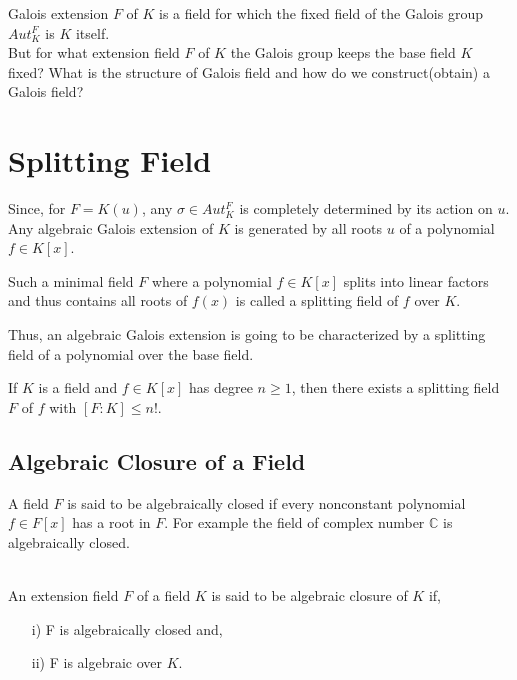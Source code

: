 Galois extension \(F\) of  \(K\) is a field for which the fixed field of the Galois group \(Aut_K^F\) is \(K\) itself.\\
But for what extension field \(F\) of \(K\) the Galois group keeps the base field \(K\) fixed? What is the structure of Galois field and how do we construct(obtain) a Galois field?


\section{Splitting Field}
Since, for \(F=K(u)\), any \(\sigma \in Aut_K^F\) is completely determined by its action on \(u\). Any algebraic Galois extension of \(K\) is generated by all roots \(u\) of a polynomial \(f \in K[x]\).

\begin{definition}
  Such a minimal field \(F\) where a polynomial \(f \in K[x]\) splits into linear factors and thus contains all roots of \(f(x)\) is called a splitting field of \(f\) over \(K\).
\end{definition}
Thus, an algebraic Galois extension is going to be characterized by a splitting field of a polynomial over the base field.\\

\begin{theorem}
  If \(K\) is a field and \(f \in K[x]\) has degree \(n \geq 1\), then there exists a splitting field \(F\) of \(f\) with \([F:K] \leq n!\).
  \end{theorem}

\subsection{Algebraic Closure of a Field}
A field \(F\) is said to be algebraically closed if every nonconstant polynomial \(f \in F[x]\) has a root in \(F\).
For example the field of complex number \(\mathbb{C}\) is algebraically closed.\\ \\

\begin{definition}
An extension field \(F\) of a field \(K\) is said to be algebraic closure of \(K\) if,
\begin{enumerate}
\item[i)] F is algebraically closed and,
  \item[ii)] F is algebraic over \(K\).
  \end{enumerate}
\end{definition}


